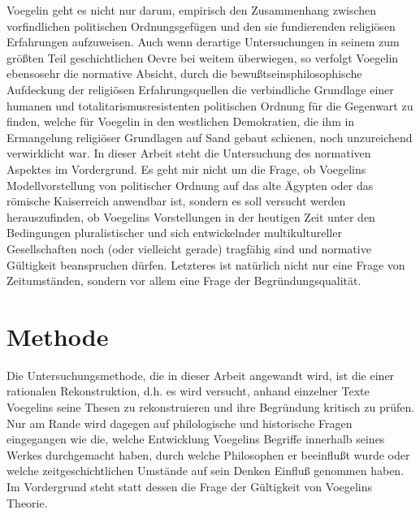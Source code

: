 Voegelin geht es nicht nur darum, empirisch den Zusammenhang zwischen
vorfindlichen politischen Ordnungsgefügen und den sie fundierenden
religiösen Erfahrungen aufzuweisen. Auch wenn derartige Untersuchungen
in seinem zum größten Teil geschichtlichen Oevre bei weitem überwiegen,
so verfolgt Voegelin ebensosehr die normative Absicht, durch die
bewußtseinsphilosophische Aufdeckung der religiösen Erfahrungsquellen
die verbindliche Grundlage einer humanen und totalitarismusresistenten
politischen Ordnung für die Gegenwart zu finden, welche für Voegelin in
den westlichen Demokratien, die ihm in Ermangelung religiöser Grundlagen
auf Sand gebaut schienen, noch unzureichend verwirklicht war. In dieser
Arbeit steht die Untersuchung des normativen Aspektes im Vordergrund. Es
geht mir nicht um die Frage, ob Voegelins Modellvorstellung von
politischer Ordnung auf das alte Ägypten oder das römische Kaiserreich
anwendbar ist, sondern es soll versucht werden herauszufinden, ob
Voegelins Vorstellungen in der heutigen Zeit unter den Bedingungen
pluralistischer und sich entwickelnder multikultureller Gesellschaften
noch (oder vielleicht gerade) tragfähig sind und normative Gültigkeit
beanspruchen dürfen. Letzteres ist natürlich nicht nur eine Frage von
Zeitumständen, sondern vor allem eine Frage der Begründungsqualität.

\section{Methode}

Die Untersuchungsmethode, die in dieser Arbeit angewandt wird, ist die einer
rationalen Rekonstruktion, d.h. es wird versucht, anhand einzelner Texte
Voegelins seine Thesen zu rekonstruieren und ihre Begründung kritisch zu
prüfen. Nur am Rande wird dagegen auf philologische und historische Fragen
eingegangen wie die, welche Entwicklung Voegelins Begriffe innerhalb seines
Werkes durchgemacht haben, durch welche Philosophen er beeinflußt wurde oder
welche zeitgeschichtlichen Umstände auf sein Denken Einfluß genommen haben. Im
Vordergrund steht statt dessen die Frage der Gültigkeit von Voegelins
Theorie.



